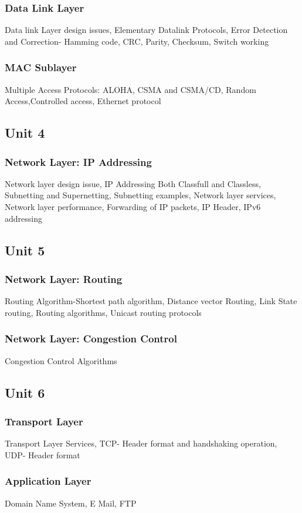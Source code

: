\documentclass[twocolumn]{article}
\begin{document}
    \subsubsection*{Data Link Layer}
    Data link Layer design issues, Elementary Datalink Protocols, Error Detection and Correction- Hamming code, CRC, Parity, Checksum, Switch working
    \subsubsection*{MAC Sublayer}
    Multiple Access Protocols: ALOHA, CSMA and CSMA/CD, Random Access,Controlled access, Ethernet protocol
    \subsection*{Unit 4}
    \subsubsection*{Network Layer: IP Addressing}
    Network layer design issue, IP Addressing Both Classfull and Classless, Subnetting and Supernetting, Subnetting examples, Network layer services, Network layer performance, Forwarding of IP packets, IP Header, IPv6 addressing
    \subsection*{Unit 5}
    \subsubsection*{Network Layer: Routing}
    Routing Algorithm-Shortest path algorithm, Distance vector Routing, Link State routing, Routing algorithms, Unicast routing protocols
    \subsubsection*{Network Layer: Congestion Control}
    Congestion Control Algorithms
    \subsection*{Unit 6}
    \subsubsection*{Transport Layer}
    Transport Layer Services, TCP- Header format and handshaking operation, UDP- Header format
    \subsubsection*{Application Layer}
    Domain Name System, E Mail, FTP
\end{document}

